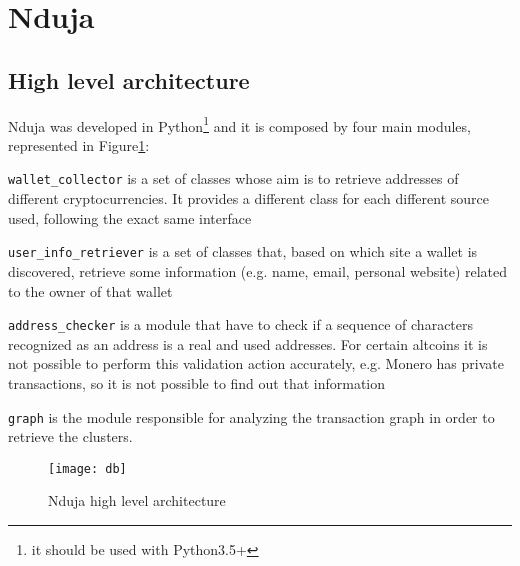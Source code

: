 \newcommand{\walletcollector}{\texttt{wallet\_collector}}
\newcommand{\userinforetriever}{\texttt{user\_info\_retriever}}
\newcommand{\addresschecker}{\texttt{address\_checker}}
\newcommand{\graph}{\texttt{graph}}

\section{Nduja} \label{nduja}
\subsection{High level architecture}
Nduja was developed in Python\footnote{it should be used with Python3.5+} and it
is composed by four main modules, represented in Figure\ref{fig:architecture}:
\begin{enumerate*}[label=\roman*),itemjoin={,\quad}]
\item \walletcollector{} is a set of classes whose aim is to retrieve
addresses of different cryptocurrencies. It provides a different class for each
different source used, following the exact same interface
\item \userinforetriever{} is a set of classes that, based on which
site a wallet is discovered, retrieve some information (e.g. name, email,
personal website) related to the owner of that wallet
\item \addresschecker{} is a module that have to check if a sequence of
characters recognized as an address is a real and used addresses. For certain
altcoins it is not possible to perform this validation action accurately, e.g.
Monero has private transactions, so it is not possible to find out that
information
\item \graph{} is the module responsible for analyzing the transaction graph
in order to retrieve the clusters.
\end{enumerate*}

\begin{figure}[t]
\centering
\texttt{[image: db]}
\caption{Nduja high level architecture}
\label{fig:architecture}
\end{figure}

